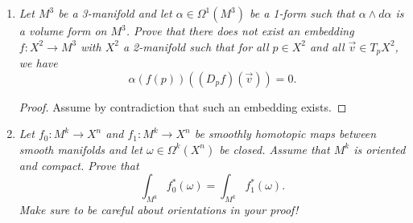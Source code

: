 \documentclass{article}
\begin{document}
\begin{enumerate}[label={\bf Q\arabic*:}]
    \begin{proof}
      Given $g\in G$, define the left multiplication function
      $L_g:G\rightarrow G$ by $L_g(x)=gx$. Then $L_g$ is a diffeomorphism,
      and $L_g(e)=ge=g$, where $e$ is the group identity. Thus $L_g$
      induces a map on the tangent space $dL_g:T_eG\rightarrow T_gG$.  \\

      Let $v_1,\ldots,v_n$ be a basis of the tangent space $T_eG$. Then the
      $n$ vector fields $dL_g(v_1),\ldots,dL_g(v_n)\in T_gG$ are linearly
      independent at $g\in M$: First, note that each $dL_g(v_i)$ is a smooth
      vector field from the smoothness of the group operations. Now since
      $L_g$ is a diffeomorphism, $dL_g$ is an isomorphism. Then since
      $v_1,\ldots,v_n$ form a basis of $T_eG$, their images
      $dL_g(v_1),\ldots,dL_g(v_n)$ form a basis of $T_gG$. \\

      So the map $\phi:G\times \mathbb{R}^n\rightarrow TG$ defined by
      $\phi((g,V))=(g,dL_g)_e(V)$ is a smooth vector-bundle isomorphism,
      thus $TG\cong G\times\mathbb{R}^n$.
    \end{proof}

  \item \it Let $M^3$ be a 3-manifold and let $\alpha\in\Omega^1(M^3)$ be a
    1-form such that $\alpha\wedge d\alpha$ is a volume form on $M^3$.
    Prove that there does not exist an embedding $f:X^2\rightarrow M^3$
    with $X^2$ a 2-manifold such that for all $p\in X^2$ and all
    $\vec{v}\in T_pX^2$, we have
    \[\alpha(f(p))((D_pf)(\vec{v}))=0.\]

    \begin{proof}
      Assume by contradiction that such an embedding exists.
    \end{proof}

  \item \it Let $f_0:M^k\rightarrow X^n$ and $f_1:M^k\rightarrow X^n$ be
    smoothly homotopic maps between smooth manifolds and let
    $\omega\in\Omega^k(X^n)$ be closed. Assume that $M^k$ is oriented and
    compact. Prove that
    \[\int_{M^k} f_0^*(\omega)= \int_{M^k} f_1^*(\omega).\]
    Make sure to be careful about orientations in your proof!


\end{enumerate}
\end{document}
